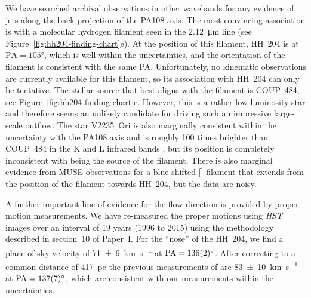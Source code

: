 \documentclass[twocolumn]{aastex63}
\begin{document}
We have searched archival observations in other wavebands
for any evidence of jets along the back projection of the PA108 axis.
The most convincing association is with a molecular hydrogen filament
seen in the \SI{2.12}{\micro m} line (see Figure~\ref{fig:hh204-finding-chart}e).
At the position of this filament, HH~204 is at \(\mathrm{PA} = \ang{105}\),
which is well within the uncertainties,
and the orientation of the filament is consistent with the same PA.\@
Unfortunately, no kinematic observations are currently available for this filament,
so its association with HH~204 can only be tentative.
The stellar source that best aligns with the  filament
is COUP~484, see Figure~\ref{fig:hh204-finding-chart}e.
However, this is a rather low luminosity star and therefore seems
an unlikely candidate for driving such an impressive large-scale outflow.
The star V2235~Ori is also marginally consistent within the uncertainty
with the PA108 axis and is roughly 100 times brighter than COUP~484
in the K and L infrared bands \citep{Muench:2002a},
but its position is completely inconsistent with being the source of the  filament.
There is also marginal evidence from MUSE observations \citep{Weilbacher:2015a}
for a blue-shifted [] filament that extends
from the position of the  filament towards HH~204, but the data are noisy. 

A further important line of evidence for the flow direction is provided
by proper motion measurements.
We have re-measured the proper motions using \emph{HST} images over an interval of 19 years (1996 to 2015) using the methodology described in section~10 of Paper~I.
For the ``nose'' of the HH~204, we find a plane-of-sky velocity of \SI{71 \pm 9}{km.s^{-1}}
at \(\mathrm{PA} = \ang{136 \pm 2}\).
After correcting to a common distance of \SI{417}{pc}
the previous measurements of \citet{Doi:2002v} are \SI{83 \pm 10}{km.s^{-1}}
at \(\mathrm{PA} = \ang{137 \pm 7}\),
which are consistent with our measurements within the uncertainties.
\end{document}
